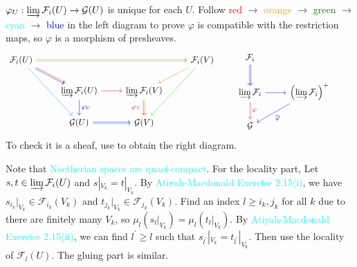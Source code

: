 \begin{exercise}\label{ex1.10}
	$\varphi_U:\varinjlim\mathcal{F}_i(U)\rightarrow\mathcal{G}(U)$ is unique for each $U$. Follow \textcolor{red}{red} $\rightarrow$ \textcolor{orange}{orange} $\rightarrow$ \textcolor{green}{green} $\rightarrow$ \textcolor{cyan}{cyan} $\rightarrow$ \textcolor{blue}{blue} in the left diagram to prove $\varphi$ is compatible with the restriction maps, so $\varphi$ is a morphism of presheaves.
	\begin{equation*}
		\begin{tikzcd}
			\mathcal{F}_i(U)\arrow[rrr,shift right=.2ex,orange]\arrow[rrr,shift left=.2ex,green]\arrow[dr,shift right=.2ex,blue]\arrow[dr,shift left=.2ex,red]\arrow[ddr,cyan]&&&\mathcal{F}_i(V)\arrow[dl,orange]\arrow[ddl,green]\\
			&\varinjlim\mathcal{F}_i(U)\arrow[r,red]\arrow[d,"\varphi_U",blue]&\varinjlim\mathcal{F}_i(V)\arrow[d,"\varphi_V"',shift right=.2ex,red]\arrow[d,shift left=.2ex,orange]&\\
			&\mathcal{G}(U)\arrow[r,shift left=.2ex,blue]\arrow[r,shift right=.2ex,cyan]&\mathcal{G}(V)&
		\end{tikzcd}
		\hspace{20pt}
		\begin{tikzcd}
			\mathcal{F}_i\arrow[d,shift right=.2ex,red]\arrow[d,shift left=.2ex,blue]&\\
			\varinjlim\mathcal{F}_i\arrow[r,blue]\arrow[d,"\varphi",red]&\left(\varinjlim\mathcal{F}_i\right)^+\arrow[ld,"\overline{\varphi}",blue]&\\
			\mathcal{G}&
		\end{tikzcd}
	\end{equation*}
	To check it is a sheaf, use  to obtain the right diagram.
\end{exercise}

\begin{exercise}\label{ex1.11}
	Note that \textcolor{cyan}{Noetherian spaces are quasi-compact}. For the locality part, Let $s,t\in\varinjlim\mathcal{F}_i(U)$ and $s|_{V_k}=t|_{V_k}$. By \textcolor{cyan}{Atiyah-Macdonald Exercise 2.15(i)}, we have $s_{i_k}|_{V_k}\in\mathcal{F}_{i_k}\!\left(V_k\right)$ and $t_{j_k}|_{V_k}\in\mathcal{F}_{j_k}\!\left(V_k\right)$. Find an index $l\geqslant i_k,j_k$ for all $k$ due to there are finitely many $V_k$, so $\mu_l\!\left(s_l|_{V_k}\right)=\mu_l\!\left(t_l|_{V_k}\right)$. By \textcolor{cyan}{Atiyah-Macdonald Exercise 2.15(ii)}, we can find $l^\prime\geqslant l$ such that $s_{l^\prime}|_{V_k}=t_{l^\prime}|_{V_k}$. Then use the locality of $\mathcal{F}_l(U)$. The gluing part is similar.
\end{exercise}


